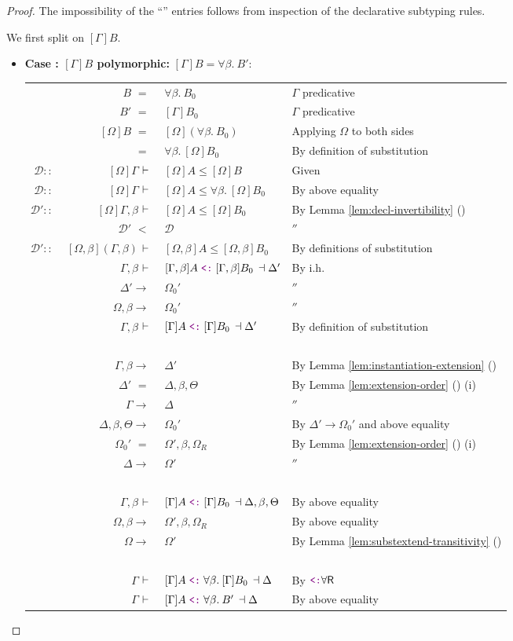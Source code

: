 \documentclass[a4paper]{article}
\makeatletter
\def\CompactJudgments{0}
\newcommand{\entails}{\mathrel{\ifnum\CompactJudgments=1\vdash \else \vdash\,\fi}}
\newcommand{\ctxoutsym}{\ifnum\CompactJudgments=1\dashv \else \,\dashv \fi}
\newcommand{\ctxout}[1]{\mathrel{\ctxoutsym}{#1}}
\newcommand{\subtypingycolor}[1]{\textcolor{dDigPurple}{#1}}
\newcommand{\subtype}{\mathrel{\normalfont\texttt{\subtypingycolor{<:}}}}  \newcommand{\declsubtype}{\mathrel{\leq}}
\newcommand{\Lemmaref}[1]{Lemma \ref{#1} (\nameref{#1})}   \newcommand{\Lemref}[1]{\Lemma \ref{#1}}   \newcommand{\Conjectureref}[1]{Conjecture \ref{#1}}
\newcommand{\Dee}{\mathcal{D}}
\newcommand{\BeginProof}{\renewcommand{\arraystretch}{1.1} \begin{tabular}[b]{r@{}r @{} l  l}}
\newcommand{\EndProof}{\end{tabular} \renewcommand{\arraystretch}{\mydefaultarraystretch}}
\newcommand{\Hand}{\text{\Pointinghand~~~~}}
\newcommand{\Pf}[4] {&$#1$ $#2$\, & $#3$ & #4 \\}
\newcommand{\Pfmrg}[3] {&$#1$\, & $#2$ & #3 \\}
\newcommand{\mkpf}[4] {\Pf{#2}{#1\,}{#3}{#4}}
\newcommand{\eqPf}[3] {\mkpf{=}{#1}{#2}{#3}}
\newcommand{\continueeqPf}[2] {\mkpf{=}{~}{#1}{#2}}
\newcommand{\ltPf}[3] {\mkpf{<}{#1}{#2}{#3}}
\newcommand{\proofsep}{\,\\[-0.5em]}
\newenvironment{llproof}{\BeginProof}{\EndProof}
\newcommand{\ditto}{\ensuremath{''}}
\newcommand{\derives}{\mathrel{::}}
\newcommand{\AllSym}{\forall}
\newcommand{\xAll}[1]{\AllSym#1}
\newcommand{\All}[1]{\xAll{#1}.\:}
\newcommand{\declsubjudgPf}[4] {\Pf{#1}{\entails}{{#2} \declsubtype {#3}}{#4}}
\newcommand{\subjudgPf}[5] {\Pf{#1}{\entails}{{#2} \subtype {#3} \ctxout{#4}}{#5}}
\newcommand{\substextendPf}[3] {\Pfmrg{{#1} \extendssym\,}{#2}{#3}}
\newcommand{\alltype}[1]{\All{#1}}
\newcommand{\extendssym}{\longrightarrow}
\newcommand{\extends}[2]{{#1} \extendssym {#2}}
\newcommand{\substextend}[2]{\extends{#1}{#2}}
\newcommand{\rulename}[1]{\text{\normalfont\textsf{#1}}}
\newcommand{\Subrulename}[1]{\ensuremath{{\subtype}\rulename{#1}}\xspace}
\newcommand{\SubAllR}{\Subrulename{\ensuremath{\forall}{R}}}
\makeatother
\begin{document}
\begin{proof}
  The impossibility of the ``\CASEimpossible'' entries follows from inspection of the
  declarative subtyping rules.

  \medskip

  We first split on $[\Gamma]B$.
  
  \begin{itemize}
  \item \textbf{Case \CaseBpoly: $[\Gamma]B$ polymorphic:}  $[\Gamma]B = \alltype{\beta} B'$:
    
    \begin{llproof}
      \eqPf{B} {\alltype{\beta} B_0}   {$\Gamma$ predicative}
      \eqPf{B'} {[\Gamma]B_0}   {$\Gamma$ predicative}
      \eqPf{[\Omega]B} {[\Omega](\alltype{\beta} B_0)}   {Applying $\Omega$ to both sides}
      \continueeqPf {\alltype{\beta} [\Omega]B_0}   {By definition of substitution}
      $\Dee \derives~$ \declsubjudgPf{[\Omega]\Gamma} {[\Omega]A} {[\Omega]B}   {Given}
      $\Dee \derives~$ \declsubjudgPf{[\Omega]\Gamma} {[\Omega]A} {\alltype{\beta} [\Omega]B_0}   {By above equality}
      $\Dee' \derives~$ \declsubjudgPf{[\Omega]\Gamma, \beta}
                    {[\Omega]A}
                    {[\Omega]B_0}
            {By \Lemmaref{lem:decl-invertibility}}
      \ltPf{\Dee'} {\Dee}   {\ditto}
      $\Dee' \derives~$ \declsubjudgPf{[\Omega, \beta](\Gamma, \beta)}
                    {[\Omega, \beta]A}
                    {[\Omega, \beta]B_0}
            {By definitions of substitution}
      \subjudgPf{\Gamma, \beta}{[\Gamma, \beta]A}{[\Gamma, \beta]B_0} {\Delta'}  {By i.h.}
      \substextendPf{\Delta'}{\Omega_0'}   {\ditto}
      \substextendPf{\Omega, \beta}{\Omega_0'}   {\ditto}
      \subjudgPf{\Gamma, \beta}{[\Gamma]A}{[\Gamma]B_0} {\Delta'}  {By definition of substitution}
      \proofsep
      \substextendPf{\Gamma, \beta} {\Delta'}  {By \Lemmaref{lem:instantiation-extension}}
      \eqPf{\Delta'}{\Delta, \beta, \Theta}  {By \Lemmaref{lem:extension-order} (i)}
      \substextendPf{\Gamma}{\Delta}  {\ditto}
      \substextendPf{\Delta, \beta, \Theta}{\Omega_0'}   {By $\substextend{\Delta'}{\Omega_0'}$ and above equality}
      \eqPf{\Omega_0'}{\Omega', \beta, \Omega_R}  {By \Lemmaref{lem:extension-order} (i)}
\Hand      \substextendPf{\Delta}{\Omega'}  {\ditto}
      \proofsep
      \subjudgPf{\Gamma, \beta}{[\Gamma]A}{[\Gamma]B_0} {\Delta, \beta, \Theta}  {By above equality}
\substextendPf{\Omega, \beta}{\Omega', \beta, \Omega_R}   {By above equality}
\Hand      \substextendPf{\Omega}{\Omega'}   {By \Lemmaref{lem:substextend-transitivity}}
      \proofsep
      \subjudgPf{\Gamma}{[\Gamma]A}{\alltype{\beta}{[\Gamma]B_0}}{\Delta}  {By \SubAllR}
\Hand      \subjudgPf{\Gamma}{[\Gamma]A}{\alltype{\beta} B'}{\Delta}  {By above equality}
    \end{llproof}



\end{itemize}
\end{proof}
\end{document}
